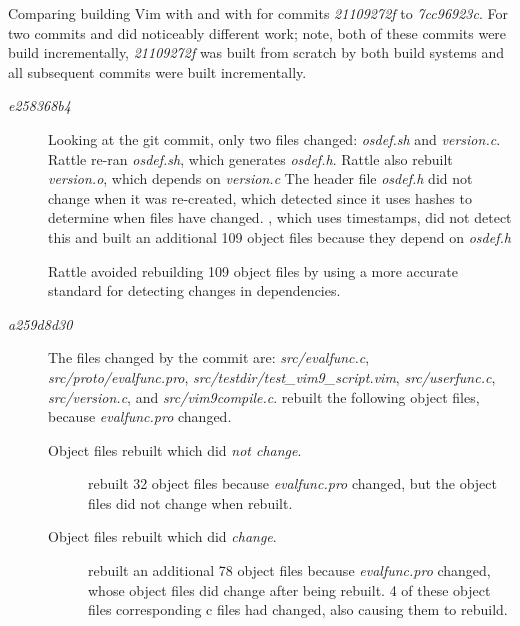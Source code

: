 
Comparing building Vim \cite{} with \Make and with \Rattle for commits \emph{21109272f} to \emph{7cc96923c}.  For two commits \Make and \Rattle did noticeably different work; note, both of these commits were build incrementally, \emph{21109272f} was built from scratch by both build systems and all subsequent commits were built incrementally.

\begin{description}
\item[\emph{e258368b4}]
  Looking at the git commit, only two files changed: \emph{osdef.sh} and \emph{version.c}.  Rattle re-ran \emph{osdef.sh}, which generates \emph{osdef.h}.  Rattle also rebuilt \emph{version.o}, which depends on \emph{version.c}
  The header file \emph{osdef.h} did not change when it was re-created, which \Rattle detected since it uses hashes to determine when files have changed.  \Make, which uses timestamps, did not detect this and built an additional 109 object files because they depend on \emph{osdef.h}

  Rattle avoided rebuilding 109 object files by using a more accurate standard for detecting changes in dependencies.

\item[\emph{a259d8d30}]
  The files changed by the commit are: \emph{src/evalfunc.c}, \emph{src/proto/evalfunc.pro},
  \emph{src/testdir/test\_vim9\_script.vim}, \emph{src/userfunc.c}, \emph{src/version.c}, and
  \emph{src/vim9compile.c}.
  \Rattle rebuilt the following object files, because \emph{evalfunc.pro} changed.
  \begin{description}
  \item[Object files rebuilt which did \emph{not change}.] \Rattle rebuilt 32 object files because \emph{evalfunc.pro} changed, but the object files did not change when rebuilt.
  \item[Object files rebuilt which did \emph{change}.] \Rattle rebuilt an additional 78 object files because \emph{evalfunc.pro} changed, whose object files did change after being rebuilt.
    4 of these object files corresponding c files had changed, also causing them to rebuild.


\end{description}
\end{description}
